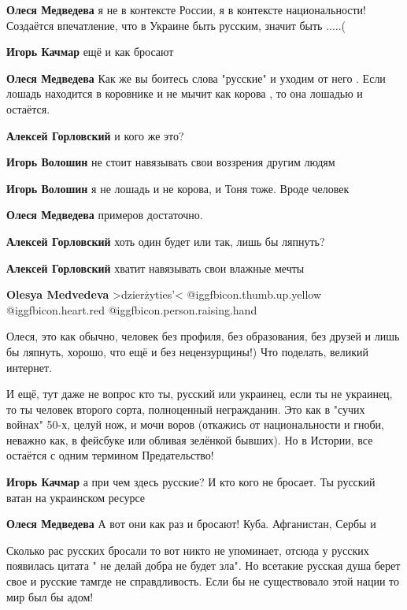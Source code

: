 \begin{itemize}
\begin{itemize}
\textbf{Олеся Медведева} я не в контексте России, я в контексте национальности! Создаётся впечатление, что в Украине быть русским, значит быть .....(

\textbf{Игорь Качмар} ещё и как бросают

\textbf{Олеся Медведева}
Как же вы боитесь слова "русские" и уходим от него .
Если лошадь находится в коровнике и не мычит как корова , то она лошадью и остаётся.

\textbf{Алексей Горловский} и кого же это?

\textbf{Игорь Волошин} не стоит навязывать свои воззрения другим людям

\textbf{Игорь Волошин} я не лошадь и не корова, и Тоня тоже. Вроде человек

\textbf{Олеся Медведева} примеров достаточно.

\textbf{Алексей Горловский} хоть один будет или так, лишь бы ляпнуть?

\textbf{Алексей Горловский} хватит навязывать свои влажные мечты

\textbf{Olesya Medvedeva} >dzierżyties'<  @igg{fbicon.thumb.up.yellow} @igg{fbicon.heart.red} @igg{fbicon.person.raising.hand} 

Олеся, это как обычно, человек без профиля, без образования, без друзей и лишь бы ляпнуть, хорошо, что ещё и без нецензурщины!) Что поделать, великий интернет.


И ещё, тут даже не вопрос кто ты, русский или украинец, если ты не украинец, то
ты человек второго сорта, полноценный негражданин. Это как в "сучих войнах"
50-х, целуй нож, и мочи воров (откажись от национальности и гноби, неважно как,
в фейсбуке или обливая зелёнкой бывших). Но в Истории, все остаётся с одним
термином Предательство!

\textbf{Игорь Качмар} а при чем здесь русские? И кто кого не бросает. Ты русский ватан на украинском ресурсе

\textbf{Олеся Медведева} А вот они как раз и бросают! Куба. Афганистан, Сербы и


Сколько рас русских бросали то вот никто не упоминает, отсюда у русских
появилась цитата " не делай добра не будет зла". Но всетакие русская душа берет
свое и русские тамгде не справдливость. Если бы не существовало этой нации то
мир был бы адом!



\end{itemize}
\end{itemize}
